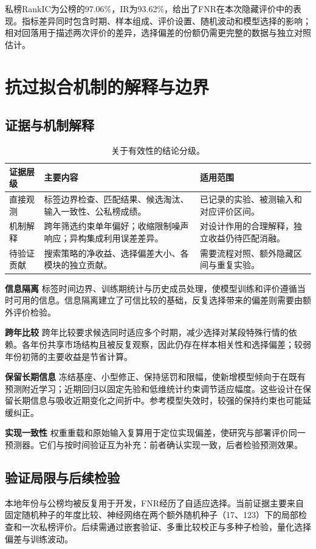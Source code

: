 \documentclass[UTF8,11pt,a4paper,fontset=fandol]{ctexart}
\begin{document}
私榜RankIC为公榜的97.06\%，IR为93.62\%，给出了FNR在本次隐藏评价中的表现。指标差异同时包含时期、样本组成、评价设置、随机波动和模型选择的影响；相对回落用于描述两次评价的差异，选择偏差的份额仍需更完整的数据与独立对照估计。

\section{抗过拟合机制的解释与边界}
\subsection{证据与机制解释}
\begin{table}[htbp]\centering\small
\caption{关于有效性的结论分级。}\label{tab:evidence}
\begin{tabularx}{\linewidth}{p{2.1cm}XX}\toprule
证据层级 & 主要内容 & 适用范围\\\midrule
直接观测 & 标签边界检查、匹配结果、候选淘汰、输入一致性、公私榜成绩。 & 已记录的实验、被测输入和对应评价区间。\\
机制解释 & 跨年筛选约束单年偏好；收缩限制噪声响应；异构集成利用误差差异。 & 对设计作用的合理解释，独立收益仍待匹配消融。\\
待验证贡献 & 搜索策略的净收益、选择偏差大小、各模块的独立贡献。 & 需要流程对照、额外隐藏区间与重复实验。\\\bottomrule
\end{tabularx}
\end{table}

\noindent\textbf{信息隔离}\quad
标签时间边界、训练期统计与历史成员处理，使模型训练和评价遵循当时可用的信息。信息隔离建立了可信比较的基础，反复选择带来的偏差则需要由额外评价检验。

\noindent\textbf{跨年比较}\quad
跨年比较要求候选同时适应多个时期，减少选择对某段特殊行情的依赖。各年份共享市场结构且被反复观察，因此仍存在样本相关性和选择偏差；较弱年份初筛的主要收益是节省计算。

\noindent\textbf{保留长期信息}\quad
冻结基座、小型修正、保持惩罚和限幅，使新增模型倾向于在既有预测附近学习；近期回归以固定先验和低维统计约束调节适应幅度。这些设计在保留长期信息与吸收近期变化之间折中。参考模型失效时，较强的保持约束也可能延缓纠正。

\noindent\textbf{实现一致性}\quad
权重重载和原始输入复算用于定位实现偏差，使研究与部署评价同一预测器。它们与按时间验证互为补充：前者确认实现一致，后者检验预测效果。

\subsection{验证局限与后续检验}\label{sec:limitations}
本地年份与公榜均被反复用于开发，FNR经历了自适应选择。当前证据主要来自固定随机种子的年度比较、神经网络在两个额外随机种子（17、123）下的局部检查和一次私榜评价。后续需通过嵌套验证、多重比较校正与多种子检验，量化选择偏差与训练波动。
\end{document}
